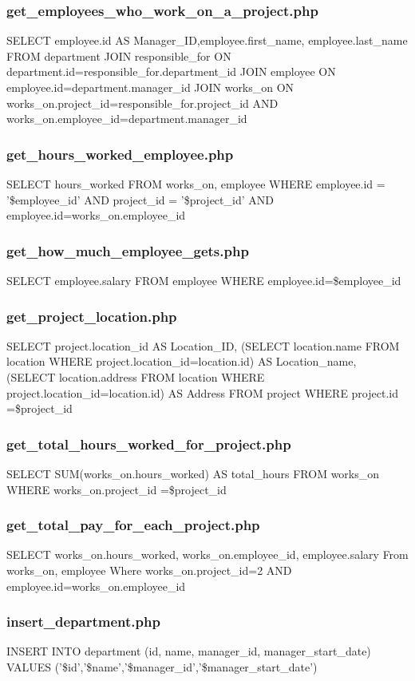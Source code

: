 \documentclass[11pt,letterpaper]{article}
\begin{document}
	\subsubsection{get\_employees\_who\_work\_on\_a\_project.php}
	SELECT employee.id AS Manager\_ID,employee.first\_name, employee.last\_name FROM department JOIN responsible\_for ON department.id=responsible\_for.department\_id JOIN employee ON employee.id=department.manager\_id JOIN works\_on ON works\_on.project\_id=responsible\_for.project\_id AND works\_on.employee\_id=department.manager\_id
	\subsubsection{get\_hours\_worked\_employee.php}
	SELECT hours\_worked FROM works\_on, employee WHERE employee.id = '\$employee\_id' AND project\_id = '\$project\_id' AND employee.id=works\_on.employee\_id
	\subsubsection{get\_how\_much\_employee\_gets.php}
	SELECT employee.salary FROM employee WHERE employee.id=\$employee\_id
	\subsubsection{get\_project\_location.php}
	SELECT project.location\_id AS Location\_ID, (SELECT location.name FROM location WHERE project.location\_id=location.id) AS Location\_name, (SELECT location.address FROM location WHERE project.location\_id=location.id) AS Address FROM project WHERE project.id =\$project\_id
	\subsubsection{get\_total\_hours\_worked\_for\_project.php}
	SELECT SUM(works\_on.hours\_worked) AS total\_hours FROM works\_on WHERE works\_on.project\_id =\$project\_id
	\subsubsection{get\_total\_pay\_for\_each\_project.php}
	SELECT works\_on.hours\_worked, works\_on.employee\_id, employee.salary From works\_on, employee Where  works\_on.project\_id=2 AND employee.id=works\_on.employee\_id
	\subsubsection{insert\_department.php}
	INSERT INTO department (id, name, manager\_id, manager\_start\_date) VALUES ('\$id','\$name','\$manager\_id','\$manager\_start\_date')
\end{document}
